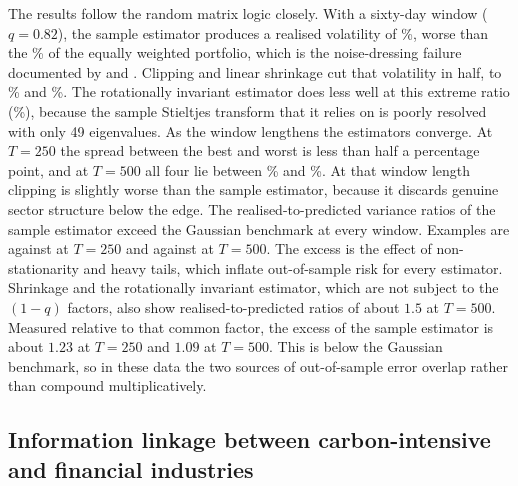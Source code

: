 \begin{table}[htbp]
\centering
\caption{Global minimum-variance portfolios of 49 industries, rebalanced every 21 days on a common out-of-sample period. Columns 3--6: realised annualised volatility in percent. Column 7: ratio of realised to in-sample predicted variance for the sample estimator. Column 8: its Gaussian benchmark $(1-q)^{-2}$, the product of the in-sample and out-of-sample factors in \eqref{eq:gmv}.}
\label{tab:backtest}
\small

\end{table}

The results follow the random matrix logic closely. With a sixty-day window ($q=0.82$), the sample estimator produces a realised volatility of \VolSampleSixty{}\%, worse than the \EWVol{}\% of the equally weighted portfolio, which is the noise-dressing failure documented by \citet{pafka2003noisy} and \citet{demiguel2009optimal}. Clipping and linear shrinkage cut that volatility in half, to \VolClipSixty{}\% and \VolLWSixty{}\%. The rotationally invariant estimator does less well at this extreme ratio (\VolRIESixty{}\%), because the sample Stieltjes transform that it relies on is poorly resolved with only 49 eigenvalues. As the window lengthens the estimators converge. At $T=250$ the spread between the best and worst is less than half a percentage point, and at $T=500$ all four lie between \VolSampleFiveHundred{}\% and \VolClipFiveHundred{}\%. At that window length clipping is slightly worse than the sample estimator, because it discards genuine sector structure below the edge. The realised-to-predicted variance ratios of the sample estimator exceed the Gaussian benchmark at every window. Examples are \RatioTwoFifty{} against \TheoryTwoFifty{} at $T=250$ and \RatioFiveHundred{} against \TheoryFiveHundred{} at $T=500$. The excess is the effect of non-stationarity and heavy tails, which inflate out-of-sample risk for every estimator. Shrinkage and the rotationally invariant estimator, which are not subject to the $(1-q)$ factors, also show realised-to-predicted ratios of about $1.5$ at $T=500$. Measured relative to that common factor, the excess of the sample estimator is about $1.23$ at $T=250$ and $1.09$ at $T=500$. This is below the Gaussian benchmark, so in these data the two sources of out-of-sample error overlap rather than compound multiplicatively.

\subsection*{Information linkage between carbon-intensive and financial industries}


